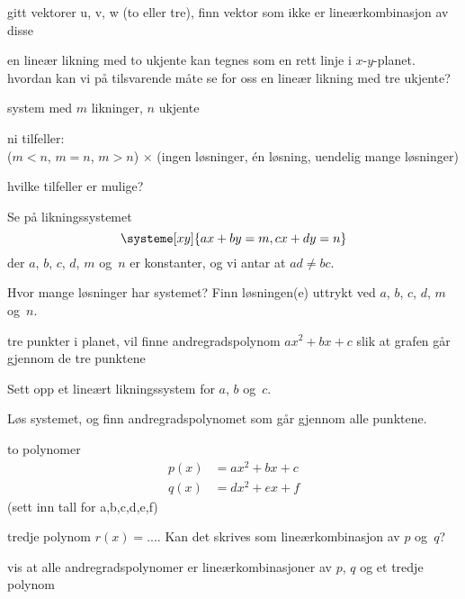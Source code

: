 \documentclass[11pt, a4paper, norsk]{NTNUoving}
\begin{document}
\begin{oppgave}
gitt vektorer u, v, w (to eller tre), finn vektor som ikke er lineærkombinasjon av disse
\end{oppgave}


\begin{oppgave}
en lineær likning med to ukjente kan tegnes som en rett linje i $x$-$y$-planet.
hvordan kan vi på tilsvarende måte se for oss en lineær likning med tre ukjente?
\end{oppgave}


\begin{oppgave}
system med $m$ likninger, $n$ ukjente

ni tilfeller:\\
($m < n$, $m = n$, $m > n$) $\times$ (ingen løsninger, én løsning, uendelig mange løsninger)

hvilke tilfeller er mulige?
\end{oppgave}


\begin{oppgave}
Se på likningssystemet
\[
\systeme[xy]{
  ax + by = m,
  cx + dy = n
}
\]
der $a$, $b$, $c$, $d$, $m$ og~$n$ er konstanter, og vi antar at $ad \ne bc$.

Hvor mange løsninger har systemet?  Finn løsningen(e) uttrykt ved $a$,
$b$, $c$, $d$, $m$ og~$n$.
\end{oppgave}


\begin{oppgave}
tre punkter i planet, vil finne andregradspolynom $ax^2 + bx + c$ slik
at grafen går gjennom de tre punktene
\begin{punkt}
Sett opp et lineært likningssystem for $a$, $b$ og~$c$.
\end{punkt}
\begin{punkt}
Løs systemet, og finn andregradspolynomet som går gjennom alle punktene.
\end{punkt}
\end{oppgave}


\begin{oppgave}
to polynomer
\begin{align*}
p(x) &= ax^2 + bx + c \\
q(x) &= dx^2 + ex + f
\end{align*}
(sett inn tall for a,b,c,d,e,f)

tredje polynom $r(x) = ...$.  Kan det skrives som lineærkombinasjon av $p$ og~$q$?

vis at alle andregradspolynomer er lineærkombinasjoner av $p$, $q$ og et tredje polynom
\end{oppgave}
\end{document}
